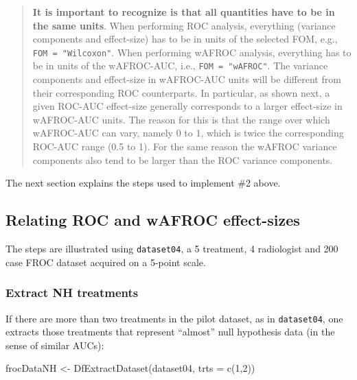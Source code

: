 \documentclass[
]{book}
\newenvironment{Shaded}{\begin{snugshade}}{\end{snugshade}}
\newcommand{\AttributeTok}[1]{\textcolor[rgb]{0.77,0.63,0.00}{#1}}
\newcommand{\DecValTok}[1]{\textcolor[rgb]{0.00,0.00,0.81}{#1}}
\newcommand{\FunctionTok}[1]{\textcolor[rgb]{0.00,0.00,0.00}{#1}}
\newcommand{\NormalTok}[1]{#1}
\newcommand{\OtherTok}[1]{\textcolor[rgb]{0.56,0.35,0.01}{#1}}
\begin{document}
\begin{quote}
\textbf{It is important to recognize is that all quantities have to be in the same units}. When performing ROC analysis, everything (variance components and effect-size) has to be in units of the selected FOM, e.g., \texttt{FOM\ =\ "Wilcoxon"}. When performing wAFROC analysis, everything has to be in units of the wAFROC-AUC, i.e., \texttt{FOM\ =\ "wAFROC"}. The variance components and effect-size in wAFROC-AUC units will be different from their corresponding ROC counterparts. In particular, as shown next, a given ROC-AUC effect-size generally corresponds to a larger effect-size in wAFROC-AUC units. The reason for this is that the range over which wAFROC-AUC can vary, namely 0 to 1, which is twice the corresponding ROC-AUC range (0.5 to 1). For the same reason the wAFROC variance components also tend to be larger than the ROC variance components.
\end{quote}

The next section explains the steps used to implement \#2 above.

\hypertarget{relating-roc-and-wafroc-effect-sizes}{%
\subsection{Relating ROC and wAFROC effect-sizes}\label{relating-roc-and-wafroc-effect-sizes}}

The steps are illustrated using \texttt{dataset04}, a 5 treatment, 4 radiologist and 200 case FROC dataset \citep{zanca2009evaluation} acquired on a 5-point scale.

\hypertarget{extract-nh-treatments}{%
\subsubsection{Extract NH treatments}\label{extract-nh-treatments}}

If there are more than two treatments in the pilot dataset, as in \texttt{dataset04}, one extracts those treatments that represent ``almost'' null hypothesis data (in the sense of similar AUCs):

\begin{Shaded}
\begin{Highlighting}[]
\NormalTok{frocDataNH }\OtherTok{\textless{}{-}} \FunctionTok{DfExtractDataset}\NormalTok{(dataset04, }\AttributeTok{trts =} \FunctionTok{c}\NormalTok{(}\DecValTok{1}\NormalTok{,}\DecValTok{2}\NormalTok{))}
\end{Highlighting}
\end{Shaded}
\end{document}
